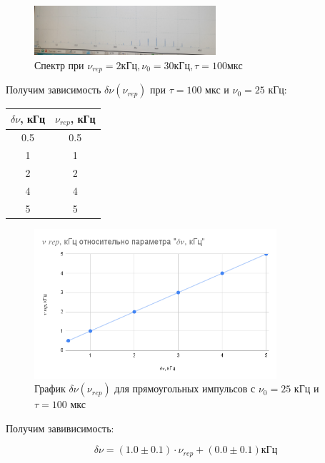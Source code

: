 \documentclass[11pt]{article}
\begin{document}
\begin{figure}[H]
    \centering
    \includegraphics[width=0.6\textwidth]{cug_5.jpg}
    \caption{Спектр при \( \nu_{rep} = 2кГц, \nu_0 = 30 кГц, \tau = 100мкс\)}
    \label{spec_cug_1}
\end{figure}

Получим зависимость \( \delta\nu (\nu_{rep}) \) при \( \tau = 100\) мкс и \(\nu_0 = 25\) кГц:


\begin{table}[H]
    \centering
    \begin{tabular}{|c|c|}
        \hline
        \(\delta\nu\), кГц & \(\nu_{rep}\), кГц\\\hline
        0.5 & 0.5 \\\hline
        1   & 1   \\\hline
        2   & 2   \\\hline
        4   & 4   \\\hline
        5   & 5   \\\hline
    \end{tabular}
\end{table}

\begin{figure}[H]
    \centering
    \includegraphics[width=0.8\textwidth]{graf2.png}
    \caption{График \( \delta\nu(\nu_{rep}) \) для прямоугольных импульсов с \( \nu_0 = 25\) кГц и \(\tau = 100\) мкс}
    \label{pic_dnu_tau}
\end{figure}

Получим завивисимость:

\[ \delta\nu = (1.0 \pm 0.1)\cdot\nu_{rep} + (0.0 \pm 0.1) кГц \]
\end{document}
